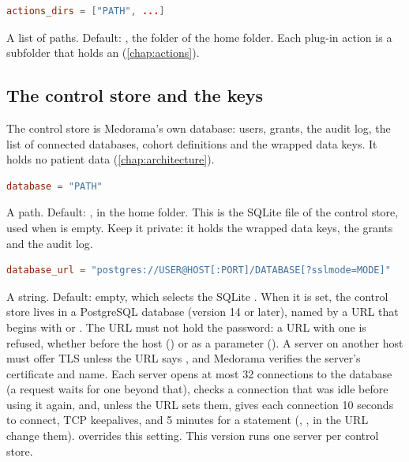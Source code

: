 \begin{lstlisting}[style=signature,language=TOML]
actions_dirs = ["PATH", ...]
\end{lstlisting}
A list of paths. Default: \code{["actions"]}, the folder  of the home folder.
Each plug-in action is a subfolder that holds an  (\cref{chap:actions}).

\subsection{The control store and the keys}
\label{sec:settings-reference-database}

The control store is Medorama's own database: users, grants, the audit log, the list of
connected databases, cohort definitions and the wrapped data keys. It holds no patient data
(\cref{chap:architecture}).

\begin{lstlisting}[style=signature,language=TOML]
database = "PATH"
\end{lstlisting}
A path. Default: , in the home folder. This is the SQLite file of the
control store, used when  is empty. Keep it private: it holds the wrapped
data keys, the grants and the audit log.

\begin{lstlisting}[style=signature,language=TOML]
database_url = "postgres://USER@HOST[:PORT]/DATABASE[?sslmode=MODE]"
\end{lstlisting}
A string. Default: empty, which selects the SQLite . When it is set, the control
store lives in a PostgreSQL database (version 14 or later), named by a URL that begins with
 or . The URL must not hold the password: a URL with one is
refused, whether before the host () or as a parameter
(). A server on another host must offer TLS unless the URL says
, and Medorama verifies the server's certificate and name. Each server
opens at most 32 connections to the database (a request waits for one beyond that), checks a
connection that was idle before using it again, and, unless the URL sets them, gives each
connection 10 seconds to connect, TCP keepalives, and 5 minutes for a statement
(, , 
in the URL change them).  overrides this setting. This version
runs one server per control store.


